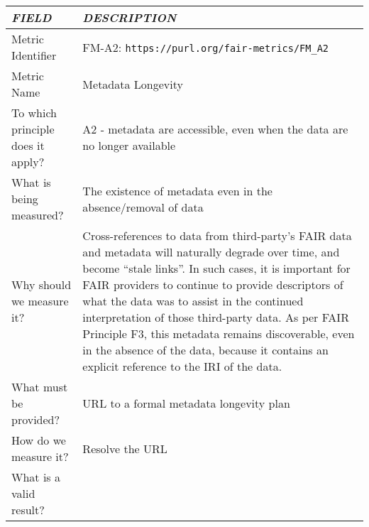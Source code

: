 \documentclass[english]{article}
\begin{document}
\begin{longtable}{|p{5cm}|p{9cm}|}


\hline
\emph{FIELD} & \emph{DESCRIPTION} \\
\hline
Metric Identifier &   FM-A2: \verb"https://purl.org/fair-metrics/FM_A2"
\\


\hline
Metric Name &   


Metadata Longevity


 \\



\hline
To which principle does it apply? &   


A2 - metadata are accessible, even when the data are no longer available

\\



\hline
What is being measured? & 


The existence of metadata even in the absence/removal of data


\\



\hline
Why should we measure it? & 



Cross-references to data from third-party’s FAIR data and metadata will naturally degrade over time, and become “stale links”.  In such cases, it is important for FAIR providers to continue to provide descriptors of what the data was to assist in the continued interpretation of those third-party data.  As per FAIR Principle F3, this metadata remains discoverable, even in the absence of the data, because it contains an explicit reference to the IRI of the data.
  
\\



\hline
What must be provided? &  


URL to a formal metadata longevity plan


\\



\hline
How do we measure it? &  

Resolve the URL


\\



\hline
What is a valid result? &  




\end{longtable}
\end{document}
